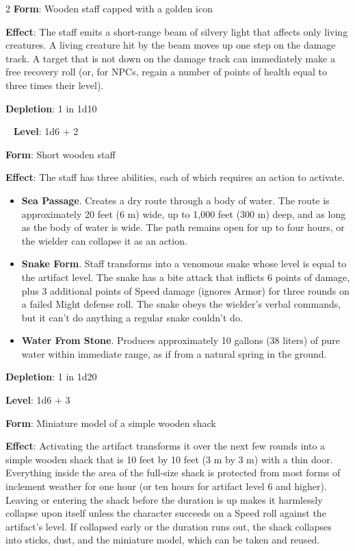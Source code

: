 \begin{multicols}{2}
\textbf{Form}: Wooden staff capped with a golden icon 

\textbf{Effect}: The staff emits a short-range beam of silvery light that affects only living creatures. A living creature hit by the beam moves up one step on the damage track. A target that is not down on the damage track can immediately make a free recovery roll (or, for NPCs, regain a number of points of health equal to three times their level). 

\textbf{Depletion}: 1 in 1d10

 
\textbf{Level}: 1d6 + 2 

\textbf{Form}: Short wooden staff 

\textbf{Effect}: The staff has three abilities, each of which requires an action to activate. 

\begin{itemize}
\item \textbf{Sea Passage}. Creates a dry route through a body of water. The route is approximately 20 feet (6 m) wide, up to 1,000 feet (300 m) deep, and as long as the body of water is wide. The path remains open for up to four hours, or the wielder can collapse it as an action. 

\item \textbf{Snake Form}. Staff transforms into a venomous snake whose level is equal to the artifact level. The snake has a bite attack that inflicts 6 points of damage, plus 3 additional points of Speed damage (ignores Armor) for three rounds on a failed Might defense roll. The snake obeys the wielder’s verbal commands, but it can’t do anything a regular snake couldn’t do. 

\item \textbf{Water From Stone}. Produces approximately 10 gallons (38 liters) of pure water within immediate range, as if from a natural spring in the ground. 
\end{itemize}

\textbf{Depletion}: 1 in 1d20 


\textbf{Level}: 1d6 + 3 

\textbf{Form}: Miniature model of a simple wooden shack 

\textbf{Effect}: Activating the artifact transforms it over the next few rounds into a simple wooden shack that is 10 feet by 10 feet (3 m by 3 m) with a thin door. Everything inside the area of the full-size shack is protected from most forms of inclement weather for one hour (or ten hours for artifact level 6 and higher). Leaving or entering the shack before the duration is up makes it harmlessly collapse upon itself unless the character succeeds on a Speed roll against the artifact’s level. If collapsed early or the duration runs out, the shack collapses into sticks, dust, and the miniature model, which can be taken and reused. 


\end{multicols}
